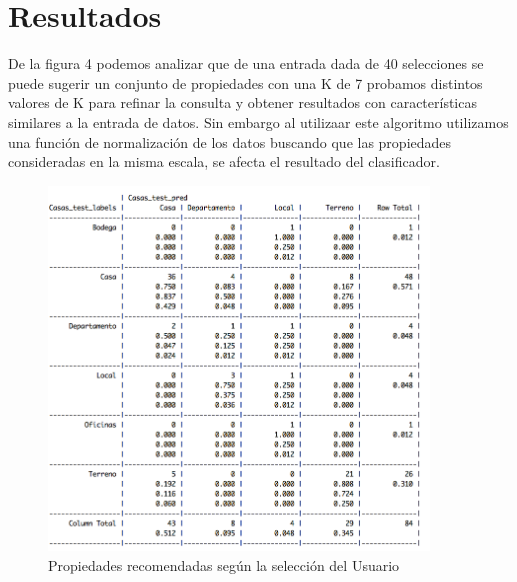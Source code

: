 \section{Resultados}
De la figura 4 podemos analizar que de una entrada dada de 40 selecciones se puede sugerir un conjunto de propiedades con una K de 7 probamos distintos valores de K para refinar la consulta y obtener resultados con características similares a la entrada de datos.
Sin embargo al utilizaar este algoritmo utilizamos una función de normalización de los datos buscando que las propiedades consideradas en la misma escala, se afecta el resultado del clasificador.


\begin{figure}[h]
\centering
\includegraphics[width=0.9\textwidth]{ModeloPredictivo.png}
\caption{Propiedades recomendadas según la selección del Usuario}
\end{figure}